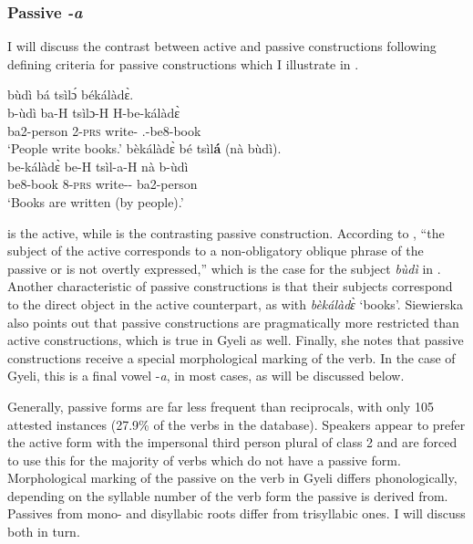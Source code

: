 \subsubsection{Passive \textit{-a}}
\label{sec:PASS}

I will discuss the contrast between active and passive constructions following  defining criteria for passive constructions which I illustrate in .

\ea \label{passdef}
\ea  \label{passdef1}
  \glll  bùdì bá tsìlɔ́ békálàdɛ̀.\\
	b-ùdì ba-H tsìlɔ-H H-be-kálàdɛ̀ \\
             ba2-person 2-\textsc{prs} write-{\R} {\OBJ}.{\LINK}-be8-book  \\
    \trans `People write books.'
\ex\label{passdef2}
 \glll  bèkálàdɛ̀ bé tsìl{\bfseries á} (nà bùdì). \\
	be-kálàdɛ̀ be-H tsìl-a-H nà b-ùdì \\
         be8-book 8-\textsc{prs} write-{\bfseries {\PASS}}-{\R} {\COM} ba2-person  \\
    \trans `Books are written (by people).'
\z
\z


\noindent  {} is the active, while  is the contrasting passive construction. According to \citet{siewierska2013}, ``the subject of the active corresponds to a non-obligatory oblique phrase of the passive or is not overtly expressed,'' which is the case for the subject {\itshape bùdì} in . Another characteristic of passive constructions is that their subjects correspond to the direct object in the active counterpart, as with {\itshape bèkálàdɛ̀} `books'. Siewierska also points out that passive constructions are pragmatically more restricted than active constructions, which is true in Gyeli as well. Finally, she notes that passive constructions receive a special morphological marking of the verb. In the case of Gyeli, this is a final vowel -{\itshape a}, in most cases, as will be discussed below.

Generally, passive forms are far less frequent than reciprocals, with only 105 attested instances (27.9\% of the verbs in the database). Speakers appear to prefer the active form with the impersonal third person plural of class 2 and are forced to use this for the majority of verbs which do not have a passive form.  Morphological marking of the passive on the verb in Gyeli differs phonologically, depending on the syllable number of the verb form the passive is derived from. Passives from mono- and disyllabic roots differ from trisyllabic ones. I will discuss both in turn.

